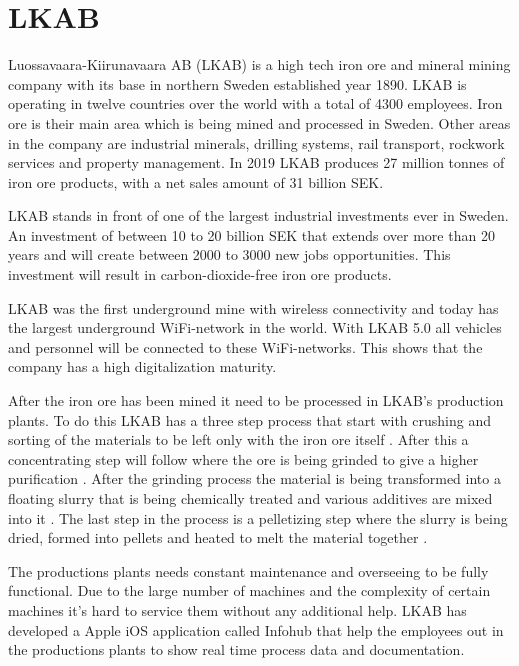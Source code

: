 \section{LKAB}
Luossavaara-Kiirunavaara AB (LKAB) is a high tech iron ore and mineral mining company with its base in northern Sweden established year 1890.
LKAB is operating in twelve countries over the world with a total of 4300 employees.
Iron ore is their main area which is being mined and processed in Sweden.
Other areas in the company are industrial minerals, drilling systems, rail transport, rockwork services and property management.
In 2019 LKAB produces 27 million tonnes of iron ore products, with a net sales amount of 31 billion SEK. \cite{LKABBrief} 

\bigskip

LKAB stands in front of one of the largest industrial investments ever in Sweden.
An investment of between 10 to 20 billion SEK that extends over more than 20 years and will create between 2000 to 3000 new jobs opportunities.
This investment will result in carbon-dioxide-free iron ore products. \cite{LKABInvestment}

\bigskip

LKAB was the first underground mine with wireless connectivity and today has the largest underground WiFi-network in the world.
With LKAB 5.0 all vehicles and personnel will be connected to these WiFi-networks.
This shows that the company has a high digitalization maturity. \cite{LKABITDevelopment}

\bigskip

After the iron ore has been mined it need to be processed in LKAB's production plants.
To do this LKAB has a three step process that start with crushing and sorting of the materials to be left only with the iron ore itself \cite{LKABProcessSorting}.
After this a concentrating step will follow where the ore is being grinded to give a higher purification \cite{LKABProcessConcentration}. After the grinding process the material is being transformed into a floating slurry that is being chemically treated and various additives are mixed into it \cite{LKABProcessConcentration}. 
The last step in the process is a pelletizing step where the slurry is being dried, formed into pellets and heated to melt the material together \cite{LKABProcessPelletizing}. \cite{LKABProcessing} 

\bigskip

The productions plants needs constant maintenance and overseeing to be fully functional.
Due to the large number of machines and the complexity of certain machines it's hard to service them without any additional help.
LKAB has developed a Apple iOS application called Infohub that help the employees out in the productions plants to show real time process data and documentation.

